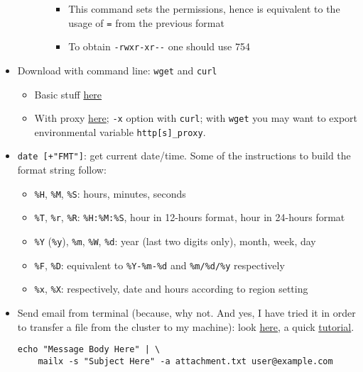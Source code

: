 \documentclass[a4paper,12pt,%
              final%
              ]{article}
\begin{document}
\begin{itemize}
\begin{itemize}
\begin{itemize}
\begin{itemize}
              \item This command sets the permissions, hence is equivalent to the usage of \verb|=| from the previous format
              \item To obtain \verb|-rwxr-xr--| one should use 754
            \end{itemize}
        \end{itemize}
    \end{itemize}
  \item Download with command line: \texttt{wget} and \texttt{curl}
    \begin{itemize}
      \item Basic stuff \href{https://linuxconfig.org/download-file-from-url-on-linux-using-command-line}{here}
      \item With proxy \href{https://www.cyberciti.biz/faq/linux-unix-curl-command-with-proxy-username-password-http-options/}{here}; \verb|-x| option with \texttt{curl}; with \texttt{wget} you may want to export environmental variable \verb|http[s]_proxy|.
    \end{itemize}
  \item \verb|date [+"FMT"]|: get current date/time. Some of the instructions to build the format string follow:
    \begin{itemize}
      \item \verb|%H|, \verb|%M|, \verb|%S|: hours, minutes, seconds
      \item \verb|%T|, \verb|%r|, \verb|%R|: \verb|%H:%M:%S|, hour in 12-hours format, hour in 24-hours format
      \item \verb|%Y| (\verb|%y|), \verb|%m|, \verb|%W|, \verb|%d|: year (last two digits only), month, week, day
      \item \verb|%F|, \verb|%D|: equivalent to \verb|%Y-%m-%d| and \verb|%m/%d/%y| respectively
      \item \verb|%x|, \verb|%X|: respectively, date and hours according to region setting
    \end{itemize}
  \item Send email from terminal (because, why not. And yes, I have tried it in order to transfer a file from the cluster to my machine): look \href{https://www.tecmint.com/send-email-attachment-from-linux-commandline/}{here}, a quick \href{https://www.interserver.net/tips/kb/linux-mail-command-usage-examples/}{tutorial}.
\begin{verbatim}
echo "Message Body Here" | \
    mailx -s "Subject Here" -a attachment.txt user@example.com

\end{verbatim}
\end{itemize}
\end{document}
